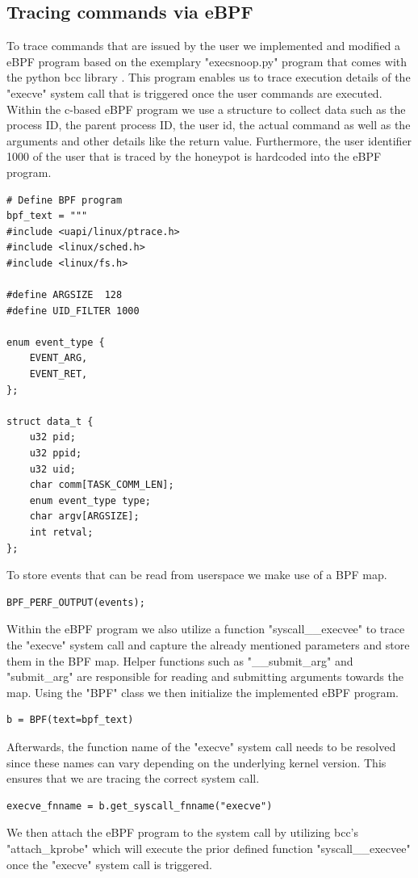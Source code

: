 \subsection{Tracing commands via eBPF}
\label{sub:ebpf}
To trace commands that are issued by the user we implemented and modified a eBPF program based on the exemplary "execsnoop.py" program that comes with the python bcc library \cite{execsnoop}. This program enables us to trace execution details of the "execve" system call that is triggered once the user commands are executed. Within the c-based eBPF program we use a structure to collect data such as the process ID, the parent process ID, the user id, the actual command as well as the arguments and other details like the return value. Furthermore, the user identifier 1000 of the user that is traced by the honeypot is hardcoded into the eBPF program. 
\begin{lstlisting}
# Define BPF program
bpf_text = """
#include <uapi/linux/ptrace.h>
#include <linux/sched.h>
#include <linux/fs.h>

#define ARGSIZE  128
#define UID_FILTER 1000

enum event_type {
    EVENT_ARG,
    EVENT_RET,
};

struct data_t {
    u32 pid;  
    u32 ppid; 
    u32 uid;
    char comm[TASK_COMM_LEN];
    enum event_type type;
    char argv[ARGSIZE];
    int retval;
};
\end{lstlisting}
To store events that can be read from userspace we make use of a BPF map.
\begin{lstlisting}
BPF_PERF_OUTPUT(events);    
\end{lstlisting}
Within the eBPF program we also utilize a function "syscall\_\_execvee" to trace the "execve" system call and capture the already mentioned parameters and store them in the BPF map. Helper functions such as "\_\_submit\_arg" and "submit\_arg" are responsible for reading and submitting arguments towards the map. Using the "BPF" class we then initialize the implemented eBPF program.
\begin{lstlisting}
b = BPF(text=bpf_text)
\end{lstlisting}
Afterwards, the function name of the "execve" system call needs to be resolved since these names can vary depending on the underlying kernel version. This ensures that we are tracing the correct system call.
\begin{lstlisting}
execve_fnname = b.get_syscall_fnname("execve")  
\end{lstlisting}
We then attach the eBPF program to the system call by utilizing bcc's "attach\_kprobe" which will execute the prior defined function "syscall\_\_execvee" once the "execve" system call is triggered.
